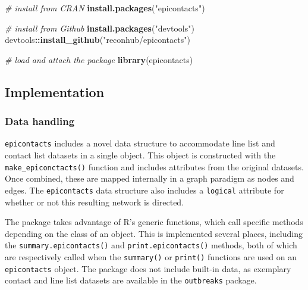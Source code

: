 \documentclass[9pt,a4paper,]{extarticle}
\newenvironment{Shaded}{\begin{snugshade}}{\end{snugshade}}
\newcommand{\KeywordTok}[1]{\textcolor[rgb]{0.13,0.29,0.53}{\textbf{#1}}}
\newcommand{\StringTok}[1]{\textcolor[rgb]{0.31,0.60,0.02}{#1}}
\newcommand{\CommentTok}[1]{\textcolor[rgb]{0.56,0.35,0.01}{\textit{#1}}}
\newcommand{\OperatorTok}[1]{\textcolor[rgb]{0.81,0.36,0.00}{\textbf{#1}}}
\newcommand{\NormalTok}[1]{#1}
\theoremstyle{definition}
\theoremstyle{definition}
\theoremstyle{definition}
\theoremstyle{remark}
\begin{document}
\begin{Shaded}
\begin{Highlighting}[]
\CommentTok{# install from CRAN}
\KeywordTok{install.packages}\NormalTok{(}\StringTok{"epicontacts"}\NormalTok{)}

\CommentTok{# install from Github}
\KeywordTok{install.packages}\NormalTok{(}\StringTok{"devtools"}\NormalTok{)}
\NormalTok{devtools}\OperatorTok{::}\KeywordTok{install_github}\NormalTok{(}\StringTok{"reconhub/epicontacts"}\NormalTok{)}
\end{Highlighting}
\end{Shaded}

\begin{Shaded}
\begin{Highlighting}[]
\CommentTok{# load and attach the package}
\KeywordTok{library}\NormalTok{(epicontacts)}
\end{Highlighting}
\end{Shaded}

\subsection{Implementation}\label{implementation}

\subsubsection{Data handling}\label{data-handling}

\texttt{epicontacts} includes a novel data structure to accommodate line list and contact list datasets in a single object. This object is constructed with the \texttt{make\_epiconctacts()} function and includes attributes from the original datasets. Once combined, these are mapped internally in a graph paradigm as nodes and edges. The \texttt{epicontacts} data structure also includes a \texttt{logical} attribute for whether or not this resulting network is directed.

The package takes advantage of R's generic functions, which call specific methods depending on the class of an object. This is implemented several places, including the \texttt{summary.epicontacts()} and \texttt{print.epicontacts()} methods, both of which are respectively called when the \texttt{summary()} or \texttt{print()} functions are used on an \texttt{epicontacts} object. The package does not include built-in data, as exemplary contact and line list datasets are available in the \texttt{outbreaks} package\citep{outbreaks}.
\end{document}
